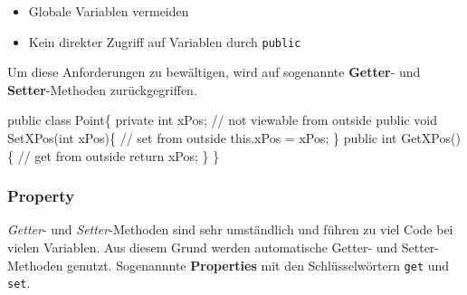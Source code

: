 \documentclass[
  9pt,
  a4paperpaper,
  DIV=11]{scrartcl}
\newenvironment{Shaded}{}{}
\newcommand{\CommentTok}[1]{\textcolor[rgb]{0.42,0.45,0.49}{#1}}
\newcommand{\DataTypeTok}[1]{\textcolor[rgb]{0.84,0.23,0.29}{#1}}
\newcommand{\FunctionTok}[1]{\textcolor[rgb]{0.44,0.26,0.76}{#1}}
\newcommand{\KeywordTok}[1]{\textcolor[rgb]{0.84,0.23,0.29}{#1}}
\newcommand{\NormalTok}[1]{\textcolor[rgb]{0.14,0.16,0.18}{#1}}
\newcommand{\OperatorTok}[1]{\textcolor[rgb]{0.14,0.16,0.18}{#1}}
\providecommand{\tightlist}{%
  \setlength{\itemsep}{0pt}\setlength{\parskip}{0pt}}\usepackage{longtable,booktabs,array}
\numberwithin{equation}{section}
\begin{document}
\begin{multicols}{2}
\begin{tcolorbox}
\begin{tcolorbox}
\begin{tcolorbox}
\begin{tcolorbox}[enhanced jigsaw, colbacktitle=quarto-callout-caution-color!10!white, colback=white, rightrule=.15mm, title=\textcolor{quarto-callout-caution-color}{\faFire}\hspace{0.5em}{Vorsicht}, opacityback=0, arc=.35mm, coltitle=black, opacitybacktitle=0.6, breakable, bottomtitle=1mm, toptitle=1mm, colframe=quarto-callout-caution-color-frame, bottomrule=.15mm, titlerule=0mm, left=2mm, leftrule=.75mm, toprule=.15mm]

\begin{itemize}
\tightlist
\item
  Globale Variablen vermeiden
\item
  Kein direkter Zugriff auf Variablen durch \texttt{public}
\end{itemize}

\end{tcolorbox}

Um diese Anforderungen zu bewältigen, wird auf sogenannte
\textbf{Getter}- und \textbf{Setter}-Methoden zurückgegriffen.

\begin{Shaded}
\begin{Highlighting}[]
\KeywordTok{public} \KeywordTok{class}\NormalTok{ Point}\OperatorTok{\{}
  \KeywordTok{private} \DataTypeTok{int}\NormalTok{ xPos}\OperatorTok{;}   \CommentTok{// not viewable from outside}
  \KeywordTok{public} \DataTypeTok{void} \FunctionTok{SetXPos}\OperatorTok{(}\DataTypeTok{int}\NormalTok{ xPos}\OperatorTok{)\{}  \CommentTok{// set from outside}
    \KeywordTok{this}\OperatorTok{.}\FunctionTok{xPos} \OperatorTok{=}\NormalTok{ xPos}\OperatorTok{;}
  \OperatorTok{\}}
  \KeywordTok{public} \DataTypeTok{int} \FunctionTok{GetXPos}\OperatorTok{()\{}   \CommentTok{// get from outside}
    \KeywordTok{return}\NormalTok{ xPos}\OperatorTok{;}
  \OperatorTok{\}}
\OperatorTok{\}}
\end{Highlighting}
\end{Shaded}

\hypertarget{property}{%
\subsubsection{Property}\label{property}}

\emph{Getter}- und \emph{Setter}-Methoden sind sehr umständlich und
führen zu viel Code bei vielen Variablen. Aus diesem Grund werden
automatische Getter- und Setter-Methoden genutzt. Sogenannnte
\textbf{Properties} mit den Schlüsselwörtern \texttt{get} und
\texttt{set}.


\end{tcolorbox}
\end{tcolorbox}
\end{tcolorbox}
\end{multicols}
\end{document}
